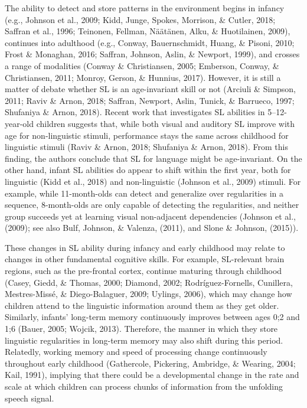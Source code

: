 \documentclass[
  english,
  man,mask,floatsintext]{apa6}
\begin{document}
The ability to detect and store patterns in the environment begins in infancy (e.g., Johnson et al., 2009; Kidd, Junge, Spokes, Morrison, \& Cutler, 2018; Saffran et al., 1996; Teinonen, Fellman, Näätänen, Alku, \& Huotilainen, 2009), continues into adulthood (e.g., Conway, Bauernschmidt, Huang, \& Pisoni, 2010; Frost \& Monaghan, 2016; Saffran, Johnson, Aslin, \& Newport, 1999), and crosses a range of modalities (Conway \& Christiansen, 2005; Emberson, Conway, \& Christiansen, 2011; Monroy, Gerson, \& Hunnius, 2017). However, it is still a matter of debate whether SL is an age-invariant skill or not (Arciuli \& Simpson, 2011; Raviv \& Arnon, 2018; Saffran, Newport, Aslin, Tunick, \& Barrueco, 1997; Shufaniya \& Arnon, 2018). Recent work that investigates SL abilities in 5--12-year-old children suggests that, while both visual and auditory SL improve with age for non-linguistic stimuli, performance stays the same across childhood for linguistic stimuli (Raviv \& Arnon, 2018; Shufaniya \& Arnon, 2018). From this finding, the authors conclude that SL for language might be age-invariant. On the other hand, infant SL abilities do appear to shift within the first year, both for linguistic (Kidd et al., 2018) and non-linguistic (Johnson et al., 2009) stimuli. For example, while 11-month-olds can detect and generalize over regularities in a sequence, 8-month-olds are only capable of detecting the regularities, and neither group succeeds yet at learning visual non-adjacent dependencies (Johnson et al., (2009); see also Bulf, Johnson, \& Valenza, (2011), and Slone \& Johnson, (2015)).

These changes in SL ability during infancy and early childhood may relate to changes in other fundamental cognitive skills. For example, SL-relevant brain regions, such as the pre-frontal cortex, continue maturing through childhood (Casey, Giedd, \& Thomas, 2000; Diamond, 2002; Rodríguez-Fornells, Cunillera, Mestres-Missé, \& Diego-Balaguer, 2009; Uylings, 2006), which may change how children attend to the linguistic information around them as they get older. Similarly, infants' long-term memory continuously improves between ages 0;2 and 1;6 (Bauer, 2005; Wojcik, 2013). Therefore, the manner in which they store linguistic regularities in long-term memory may also shift during this period. Relatedly, working memory and speed of processing change continuously throughout early childhood (Gathercole, Pickering, Ambridge, \& Wearing, 2004; Kail, 1991), implying that there could be a developmental change in the rate and scale at which children can process chunks of information from the unfolding speech signal.
\end{document}
